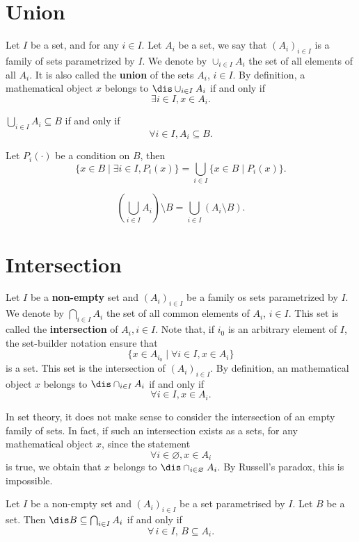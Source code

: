 \section{Union}
\begin{definitionenv}
    Let $I$ be a set, and for any $i \in I$.
    Let $A_i$ be a set, we say that $(A_i)_{i\in I}$ is a family of sets parametrized by $I$.
    We denote by $\cup_{i \in I}A_i$ the set of all elements of all $A_i$.
    It is also called the \textbf{union} of the sets $A_i$, $i\in I$.
    By definition, a mathematical object $x$ belongs to $\dis \cup_{i \in I}A_i$ if and only if
    $$\exists i\in I, x\in A_i.$$ 
\end{definitionenv}
\begin{propositionenv}
    $ \displaystyle \bigcup_{i\in I}A_i\subseteq B$ if and only if
    $$\forall i\in I, A_i\subseteq B.$$
\end{propositionenv}
\begin{corollaryenv}\label{corollary2.6.1}
    Let $P_i(\cdot) $ be a condition on $B$, then
    $$\{x\in B\mid\exists i\in I, P_i(x)\}=\bigcup_{i\in I}\{x\in B\mid P_i(x)\}.$$
\end{corollaryenv}
\begin{propositionenv}
    $$\left( \bigcup _{i\in I}A_i\right)\setminus B=\bigcup_{i\in I}\left( A_i\setminus B\right).$$
\end{propositionenv}
\section{Intersection}
\begin{definitionenv}
    Let $I$ be a \textbf{non-empty} set and $(A_i)_{i\in I} $ be a family os sets parametrized by $I$. We denote by $\displaystyle \bigcap_{i\in I}A_i $ the set of all common elements of $A_i$, $i\in I$.
    This set is called the \textbf{intersection} of $A_i, i\in I$.
    Note that, if $i_0$ is an arbitrary element of $I$, the set-builder notation ensure that
    $$\{x\in A_{i_0}\mid \forall i\in I, x\in A_i\}$$ is a set. This set is the intersection of $(A_i)_{i\in I}$.
    \newline
    By definition, an mathematical object $x$ belongs to $\dis \cap _{i\in I}A_i$ if and only if $$\forall i\in I , x\in A_i.$$
    
\end{definitionenv}
\begin{remark}
    In set theory,  it does not make sense to consider the intersection of an empty family of sets. In fact,  if such an intersection exists as a sets, for any mathematical object $x$,  since the statement
    $$\forall i\in \varnothing, x \in A_i$$
    is true, we obtain that $x$ belongs to $\dis \cap_{i\in \varnothing}A_i$. By Russell's paradox,  this is impossible.
\end{remark}
\begin{propositionenv}\label{proposition2.7.1}
Let \( I \) be a non-empty set and \( (A_i)_{i \in I} \) be a set parametrised by \( I \). Let \( B \) be a set. Then \( \dis  B \subseteq \bigcap_{i \in I} A_i \) if and only if
\[
\forall\,  i \in I, \,  B \subseteq A_i.
\]
\end{propositionenv}


